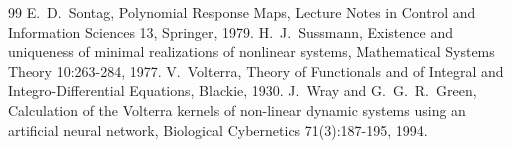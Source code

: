 \documentclass[11pt,a4paper]{article}
\theoremstyle{remark}
\begin{document}
\begin{thebibliography}{99}
 E.~D.~Sontag, Polynomial Response Maps, Lecture Notes in Control and Information Sciences 13, Springer, 1979.
 H.~J.~Sussmann, Existence and uniqueness of minimal realizations of nonlinear systems, Mathematical Systems Theory 10:263-284, 1977.
 V.~Volterra, Theory of Functionals and of Integral and Integro-Differential Equations, Blackie, 1930.
 J.~Wray and G.~G.~R.~Green, Calculation of the Volterra kernels of non-linear dynamic systems using an artificial neural network, Biological Cybernetics 71(3):187-195, 1994.
\end{thebibliography}
\end{document}
